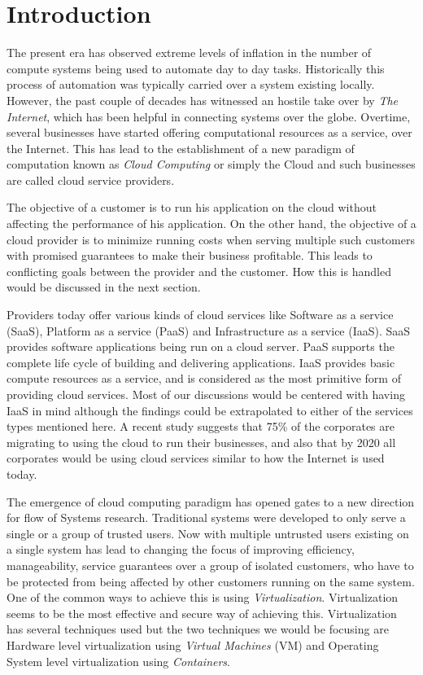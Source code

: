 \chapter{Introduction}
  
  The present era has observed extreme levels of inflation in the number of compute systems being used to automate day to day tasks. 
Historically this process of automation was typically carried over a system existing locally. However, the past couple of 
decades has witnessed an hostile take over by \textit{The Internet}, which has been helpful in connecting systems over the 
globe. Overtime, several businesses have started offering computational resources as a service, over the Internet. This has lead to 
the establishment of a new paradigm of computation known as \textit{Cloud Computing} or simply the Cloud and such businesses are called 
cloud service providers. 

  The objective of a customer is to run his application on the cloud without affecting the performance of his application. On the 
other hand, the objective of a cloud provider is to minimize running costs when serving multiple such customers with promised guarantees to 
make their business profitable. This leads to conflicting goals between the provider and the customer. How this is handled would 
be discussed in the next section. 

Providers today offer various kinds of cloud services like Software as a service (SaaS), Platform as a service (PaaS) and Infrastructure as 
a service (IaaS). SaaS provides software applications being run on a cloud server. PaaS supports the complete life cycle of building and 
delivering applications. IaaS provides basic compute resources as a service, and is considered as the most primitive form of providing 
cloud services. Most of our discussions would be centered with having IaaS in mind although the findings could be extrapolated to either of 
the services types mentioned here. A recent study \cite{forbes} suggests that 75\% of the corporates are migrating to using the cloud to 
run their businesses, and also that by 2020 all corporates would be using cloud services similar to how the Internet is used today.   

  The emergence of cloud computing paradigm has opened gates to a new direction for flow of Systems research. Traditional systems were 
developed to only serve a single or a group of trusted users. Now with multiple untrusted users existing on a single system has 
lead to changing the focus of improving efficiency, manageability, service guarantees over a group of isolated customers, who have to be
protected from being affected by other customers running on the same system. One of the common ways to achieve this is using 
\textit{Virtualization}. Virtualization seems to be the most effective and secure way of achieving this. Virtualization has several 
techniques used but the two techniques we would be focusing are Hardware level virtualization using \textit{Virtual Machines} (VM) and 
Operating System level virtualization using \textit{Containers}.

